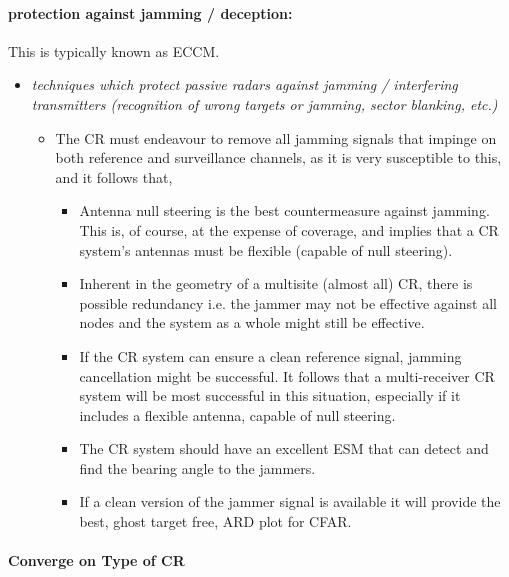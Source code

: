 \documentclass[english, 12pt]{report}
\begin{document}
\paragraph{protection against jamming / deception:}

This is typically known as ECCM.

\begin{itemize}
\item \emph{techniques which protect passive radars against jamming / interfering transmitters (recognition of wrong targets or jamming, sector blanking, etc.)}

\begin{itemize}
\item The CR must endeavour to remove all jamming signals that impinge on both reference and surveillance channels, as it is very susceptible to this, and it follows that, 

\begin{itemize}
\item Antenna null steering is the best countermeasure against jamming. This is, of course, at the expense of coverage, and implies that a CR system's antennas must be flexible (capable of null steering).
\item Inherent in the geometry of a multisite (almost all) CR, there is possible redundancy i.e. the jammer may not be effective against all nodes and the system as a whole might still be effective.
\item If the CR system can ensure a clean reference signal, jamming cancellation might be successful. It follows that a multi-receiver CR system will be most successful in this situation, especially if it includes a flexible antenna, capable of null steering.
\item The CR system should have an excellent ESM that can detect and find the bearing angle to the jammers.
\item If a clean version of the jammer signal is available it will provide the best, ghost target free, ARD plot for CFAR.
\end{itemize}
\end{itemize}
\end{itemize}






\paragraph{Converge on Type of CR}
\end{document}
